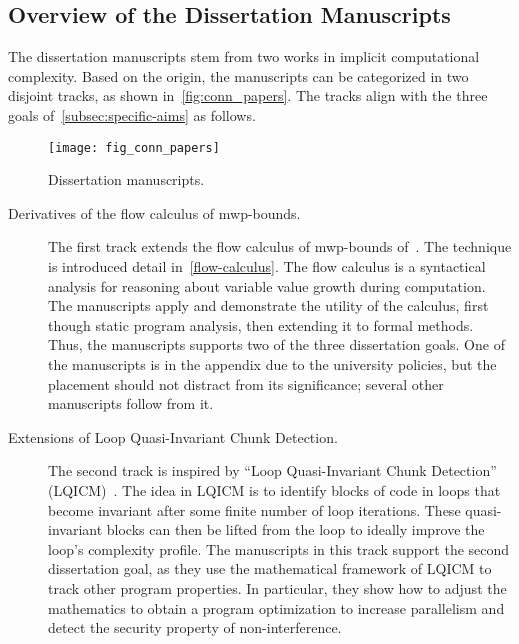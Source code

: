 \subsection{Overview of the Dissertation Manuscripts}
\label{subsec:conn-papers}

The dissertation manuscripts stem from two works in implicit computational complexity.
Based on the origin, the manuscripts can be categorized in two disjoint tracks, as shown in~\autoref{fig:conn_papers}.
The tracks align with the three goals of~\autoref{subsec:specific-aims} as follows.

\begin{figure}[p]
    \texttt{[image: fig\_conn\_papers]}
    \caption[Dissertation manuscripts]{Dissertation manuscripts.}
    \label{fig:conn_papers}
\end{figure}

\begin{description}
\item[Derivatives of the flow calculus of mwp-bounds.]
The first track extends the flow calculus of mwp-bounds of~\textcite{jones2009}.
The technique is introduced detail in~\autoref{flow-calculus}.
The flow calculus is a syntactical analysis for reasoning about variable value growth during computation.
The manuscripts apply and demonstrate the utility of the calculus, first though static program analysis, then extending it to formal methods.
Thus, the manuscripts supports two of the three dissertation goals.
One of the manuscripts is in the appendix due to the university policies, but the placement should not distract from its significance;
several other manuscripts follow from it.

\item[Extensions of Loop Quasi-Invariant Chunk Detection.]
The second track is inspired by \enquote{Loop Quasi-Invariant Chunk Detection} (LQICM)~\cite{moyen20172}.
The idea in LQICM is to identify blocks of code in loops that become invariant after some finite number of loop iterations.
These quasi-invariant blocks can then be lifted from the loop to ideally improve the loop's complexity profile.
The manuscripts in this track support the second dissertation goal,
as they use the mathematical framework of LQICM to track other program properties.
In particular, they show how to adjust the mathematics to obtain a program optimization to increase parallelism and detect the security property of non-interference.
\end{description}

